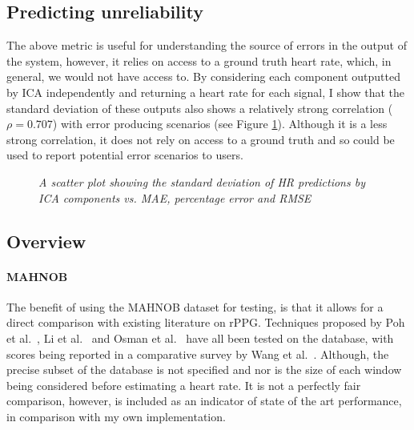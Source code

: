 \subsection{Predicting unreliability}
The above metric is useful for understanding the source of errors in the output of the system, however, it relies on access to a ground truth heart rate, which, in general, we would not have access to.
By considering each component outputted by ICA independently and returning a heart rate for each signal, I show that the standard deviation of these outputs also shows a relatively strong correlation ($\rho=0.707$) with error producing scenarios (see Figure \ref{fig:std_plots}).
Although it is a less strong correlation, it does not rely on access to a ground truth and so could be used to report potential error scenarios to users.
\begin{figure}
    \centering
    \subfloat{\scalebox{0.6}{}}
    \subfloat{\scalebox{0.6}{}}
    \subfloat{\scalebox{0.6}{}}
    \caption{\textit{A scatter plot showing the standard deviation of HR predictions by ICA components vs. MAE, percentage error and RMSE}}
    \label{fig:std_plots}
\end{figure}

\subsection{Overview}
\label{eval:overall}


\paragraph{MAHNOB}
The benefit of using the MAHNOB dataset for testing, is that it allows for a direct comparison with existing literature on rPPG.
Techniques proposed by Poh et al.~\cite{poh}, Li et al.~\cite{li} and Osman et al.~\cite{osman} have all been tested on the database, with 
scores being reported in a comparative survey by Wang et al.~\cite{comparative}.
Although, the precise subset of the database is not specified and nor is the size of each window being considered before estimating a heart rate.
It is not a perfectly fair comparison, however, is included as an indicator of state of the art performance, in comparison with my own implementation.

